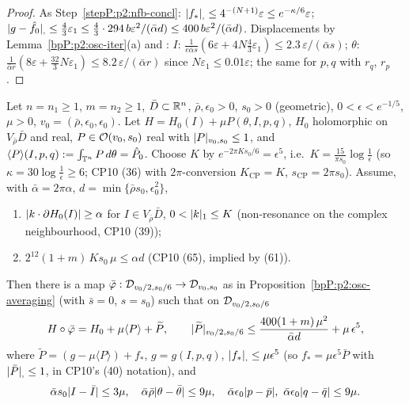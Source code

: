 \begin{proof}
\label{stepP:p2:oa-concl} As Step~\ref{stepP:p2:nfb-concl}: $\lvert f_*\rvert_{,}\le4^{-(N+1)}\varepsilon\le e^{-\kappa/6}\varepsilon$; $\lvert g-\hat f_0\rvert_{,}\le\frac43\varepsilon_1\le\frac43\cdot294\,b\varepsilon^2/(\bar\alpha d)\le400\,b\varepsilon^2/(\bar\alpha d)$. Displacements by Lemma~\ref{bpP:p2:osc-iter}(a) and : $I$: $\frac1{e\bar\alpha s}(6\varepsilon+4N\frac43\varepsilon_1)\le2.3\,\varepsilon/(\bar\alpha s)$; $\theta$: $\frac1{\bar\alpha r}(8\varepsilon+\frac{32}3N\varepsilon_1)\le8.2\,\varepsilon/(\bar\alpha r)$ since $N\varepsilon_1\le0.01\varepsilon$; the same for $p,q$ with $r_q$, $r_p$.
\end{proof}

\begin{proposition}\label{bpP:p2:averaged-remainder}
Let $n=n_1\ge1$, $m=n_2\ge1$, $\bar D\subset\mathbb{R}^n$, $\bar\rho,\epsilon_0>0$, $s_0>0$ (geometric), $0<\epsilon<e^{-1/5}$, $\mu>0$, $v_0=(\bar\rho,\epsilon_0,\epsilon_0)$. Let $H=H_0(I)+\mu P(\theta,I,p,q)$, $H_0$ holomorphic on $V_{\bar\rho}\bar D$ and real, $P\in\mathcal O(v_0,s_0)$ real with $\lvert P\rvert_{v_0,s_0}\le1$, and
$\langle P\rangle(I,p,q):=\int_{\mathbb{T}^n}P\,d\theta=\hat P_0$. Choose $K$ by $e^{-2\pi Ks_0/6}=\epsilon^5$, i.e.\ $K=\frac{15}{\pi s_0}\log\frac1\epsilon$ (so $\kappa=30\log\frac1\epsilon\ge6$; CP10 (36) with $2\pi$-conversion $K_{\mathrm{CP}}=K$, $s_{\mathrm{CP}}=2\pi s_0$). Assume, with $\bar\alpha=2\pi\alpha$, $d=\min\{\bar\rho s_0,\epsilon_0^2\}$,
\begin{enumerate}[label=(\textup{R}\arabic*)]
\item $\lvert k\cdot\partial H_0(I)\rvert\ge\alpha$ for $I\in V_{\bar\rho}\bar D$, $0<\lvert k\rvert_1\le K$ (non-resonance on the complex neighbourhood, CP10 (39));
\item $2^{12}(1+m)\,K s_0\,\mu\le\alpha d$ (CP10 (65), implied by (61)).
\end{enumerate}
Then there is a map $\bar\varphi:\mathcal D_{v_0/2,s_0/6}\to\mathcal D_{v_0,s_0}$ as in Proposition~\ref{bpP:p2:osc-averaging} (with $\bar s=0$, $s=s_0$) such that on $\mathcal D_{v_0/2,s_0/6}$
\[H\circ\bar\varphi=H_0+\mu\langle P\rangle+\widetilde P,\qquad\lvert \widetilde P\rvert_{v_0/2,s_0/6}\le\frac{400(1+m)\,\mu^2}{\bar\alpha d}+\mu\,\epsilon^5,\]
where $\widetilde P=(g-\mu\langle P\rangle)+f_*$, $g=g(I,p,q)$, $\lvert f_*\rvert_{,}\le\mu\epsilon^5$ (so $f_*=\mu\epsilon^5\bar P$ with $\lvert \bar P\rvert_{,}\le1$, in CP10's (40) notation), and
\[\bar\alpha s_0\lvert I-\bar I\rvert\le3\mu,\quad\bar\alpha\bar\rho\lvert \theta-\bar\theta\rvert\le9\mu,\quad\bar\alpha\epsilon_0\lvert p-\bar p\rvert,\ \bar\alpha\epsilon_0\lvert q-\bar q\rvert\le9\mu.\]
\end{proposition}
